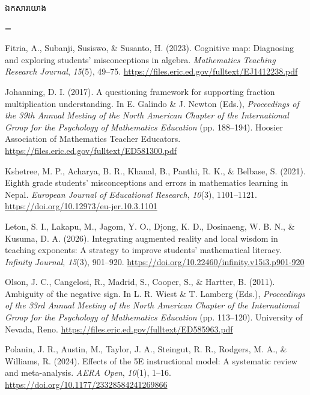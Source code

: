 \documentclass[a4paper,12pt]{article}
\newcommand{\refbanner}[1]{%
  \Needspace{2.2cm}%
  \vspace{2pt}%
  \begin{tcolorbox}[
    enhanced, sharp corners, colback=headgray, colframe=black,
    boxrule=0.85pt, borderline south={0.6pt}{1.8pt}{black},
    top=6pt, bottom=6pt, left=9pt, right=9pt,
    before skip=4pt, after skip=4pt
  ]
    {\muol\fontsize{12pt}{19pt}\selectfont #1}%
  \end{tcolorbox}%
}
\begin{document}
\refbanner{ឯកសារយោង}

{\TimesEn\linespread{1.0}\fontsize{10.8pt}{16.2pt}\selectfont
\setlength{\parskip}{2.6pt}
\everypar={\hangindent=0.85cm }

Fitria, A., Subanji, Susiswo, \& Susanto, H. (2023). Cognitive map: Diagnosing and exploring students' misconceptions in algebra. \textit{Mathematics Teaching Research Journal}, \textit{15}(5), 49--75. \url{https://files.eric.ed.gov/fulltext/EJ1412238.pdf}

Johanning, D. I. (2017). A questioning framework for supporting fraction multiplication understanding. In E. Galindo \& J. Newton (Eds.), \textit{Proceedings of the 39th Annual Meeting of the North American Chapter of the International Group for the Psychology of Mathematics Education} (pp. 188--194). Hoosier Association of Mathematics Teacher Educators. \url{https://files.eric.ed.gov/fulltext/ED581300.pdf}

Kshetree, M. P., Acharya, B. R., Khanal, B., Panthi, R. K., \& Belbase, S. (2021). Eighth grade students' misconceptions and errors in mathematics learning in Nepal. \textit{European Journal of Educational Research}, \textit{10}(3), 1101--1121. \url{https://doi.org/10.12973/eu-jer.10.3.1101}

Leton, S. I., Lakapu, M., Jagom, Y. O., Djong, K. D., Dosinaeng, W. B. N., \& Kusuma, D. A. (2026). Integrating augmented reality and local wisdom in teaching exponents: A strategy to improve students' mathematical literacy. \textit{Infinity Journal}, \textit{15}(3), 901--920. \url{https://doi.org/10.22460/infinity.v15i3.p901-920}

Olson, J. C., Cangelosi, R., Madrid, S., Cooper, S., \& Hartter, B. (2011). Ambiguity of the negative sign. In L. R. Wiest \& T. Lamberg (Eds.), \textit{Proceedings of the 33rd Annual Meeting of the North American Chapter of the International Group for the Psychology of Mathematics Education} (pp. 113--120). University of Nevada, Reno. \url{https://files.eric.ed.gov/fulltext/ED585963.pdf}

Polanin, J. R., Austin, M., Taylor, J. A., Steingut, R. R., Rodgers, M. A., \& Williams, R. (2024). Effects of the 5E instructional model: A systematic review and meta-analysis. \textit{AERA Open}, \textit{10}(1), 1--16. \url{https://doi.org/10.1177/23328584241269866}

}
\end{document}
